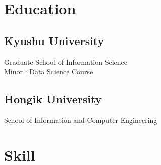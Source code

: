 \documentclass[]{deedy-resume-openfont}
\begin{document}
%
%
\sectionsep
\begin{minipage}[t]{0.44\textwidth} 


\section{Education} 

\subsection{Kyushu University}
Graduate School of Information Science\\
Minor : Data Science Course
\sectionsep

\subsection{Hongik University}
School of Information and Computer Engineering \\
\sectionsep




\section{Skill}

\end{minipage}
\end{document}
